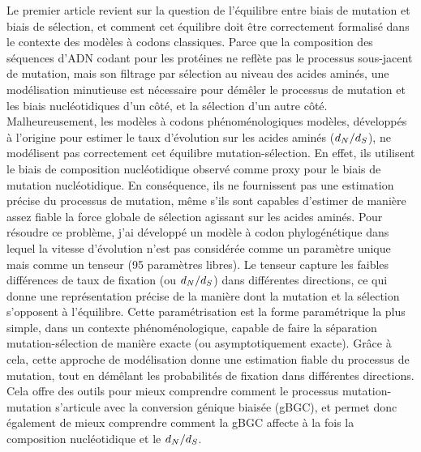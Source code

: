 Le premier article revient sur la question de l'équilibre entre biais de mutation et biais de sélection, et comment cet équilibre doit être correctement formalisé dans le contexte des modèles à codons classiques.
Parce que la composition des séquences d'ADN codant pour les protéines ne reflète pas le processus sous-jacent de mutation, mais son filtrage par sélection au niveau des acides aminés, une modélisation minutieuse est nécessaire pour démêler le processus de mutation et les biais nucléotidiques d'un côté, et la sélection d'un autre côté.
Malheureusement, les modèles à codons phénoménologiques modèles, développés à l'origine pour estimer le taux d'évolution sur les acides aminés ($d_N / d_S$), ne modélisent pas correctement cet équilibre mutation-sélection.
En effet, ils utilisent le  biais de composition nucléotidique observé comme proxy pour le biais de mutation nucléotidique.
En conséquence, ils ne fournissent pas une estimation précise du processus de mutation, même s'ils sont capables d'estimer de manière assez fiable la force globale de sélection agissant sur les acides aminés.
Pour résoudre ce problème, j'ai développé un modèle à codon phylogénétique dans lequel la vitesse d'évolution n'est pas considérée comme un paramètre unique mais comme un tenseur (95 paramètres libres).
Le tenseur capture les faibles différences de taux de fixation (ou $d_N / d_S$) dans différentes directions, ce qui donne une représentation précise de la manière dont la mutation et la sélection s'opposent à l'équilibre.
Cette paramétrisation est la forme paramétrique la plus simple, dans un contexte phénoménologique, capable de faire la séparation mutation-sélection de manière exacte (ou asymptotiquement exacte).
Grâce à cela, cette approche de modélisation donne une estimation fiable du processus de mutation, tout en démêlant les probabilités de fixation dans différentes directions.
Cela offre des outils pour mieux comprendre comment le processus mutation-mutation s’articule avec la conversion génique biaisée (gBGC), et permet donc également de mieux comprendre comment la gBGC affecte à la fois la composition nucléotidique et le $d_N / d_S$.

